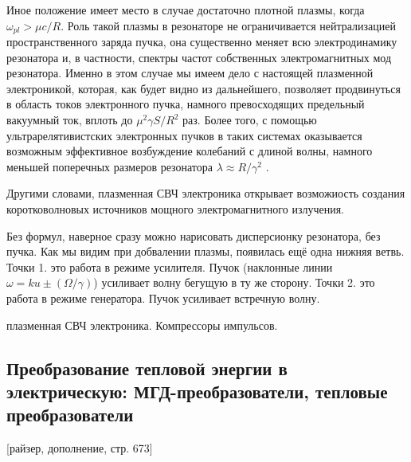 \documentclass[10pt, a4paper]{article}
\begin{document}
Иное положение имеет место в случае достаточно плотной плазмы, когда $\omega_{pl}>\mu c/R$. Роль такой плазмы в резонаторе не ограничивается нейтрализацией пространственного заряда пучка, она существенно меняет всю электродинамику резонатора и, в частности, спектры частот собственных электромагнитных мод резонатора. Именно в этом случае мы имеем дело с настоящей плазменной электроникой, которая, как будет видно из дальнейшего, позволяет продвинуться в область токов электронного пучка, намного превосходящих предельный вакуумный ток, вплоть до $\mu^{2}\gamma S/R^{2}$ раз. Более того, с помощью ультрарелятивистских электронных пучков в таких системах оказывается возможным эффективное возбуждение колебаний с длиной волны, намного меньшей поперечных размеров резонатора $\lambda \approx R/\gamma^{2}$ .

\begin{figure}[h!]
\end{figure}

Другими словами, плазменная СВЧ электроника открывает возможиость создания коротковолновых источников мощного электромагнитного излучения.


Без формул, наверное сразу можно нарисовать дисперсионку резонатора, без пучка.  Как мы видим при добвалении плазмы, появилась ещё одна нижняя ветвь. Точки 1. это работа в режиме усилителя. Пучок (наклонные линии $\omega=ku\pm (\Omega/\gamma)$) усиливает волну бегущую в ту же сторону. Точки 2. это работа в режиме генератора. Пучок усиливает встречную волну.



плазменная СВЧ электроника.
Компрессоры импульсов.


\subsection{Преобразование тепловой энергии в электрическую: МГД-преобразователи, тепловые преобразователи}
\label{14.5} 
[райзер, дополнение, стр. 673]
\end{document}
